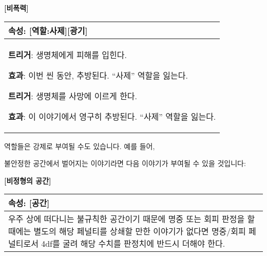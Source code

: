 \documentclass[12pt]{report}
\newenvironment{story}[2]
{\begin{center}
		{\large \textbf{[#1]}}\\[1ex]
		\begin{tabular}{|p{\textwidth}|}
			\hline
			\textbf{속성}: #2
			\\
			\hline
		}
		{ 
			\\\hline
		\end{tabular}
	\end{center}
}
\begin{document}
	\begin{story}{비폭력}{[역할:사제][광기]}
		\textbf{트리거}: 생명체에게 피해를 입힌다.
		
		\textbf{효과}: 이번 씬 동안, 추방된다. “사제” 역할을 잃는다.
		
		\textbf{트리거}: 생명체를 사망에 이르게 한다.
		
		\textbf{효과}: 이 이야기에서 영구히 추방된다. “사제” 역할을 잃는다.
	\end{story}
	
	역할들은 강제로 부여될 수도 있습니다. 예를 들어,
\iffalse
	러브크래프트 세계관에 들어간 이야기꾼들은 다음과 같은 역할이 부여될 수 있습니다:
	\begin{story}{점점 미쳐가는 이야기}{[세계][설화][광기]}
		이성치 100을 얻는다. 일반적으로 이해할 수 없는 일(살인, 시체, 고대의 존재등)을 목격할때마다, 그 수준에 따라 난이도와 피해량(성공/실패, 다이스 사용 가능)을 시스템이 지정한다. 그러면 1d(현재 정신력)을 굴려, 해당 수치가 난이도 이상이라면 이성치에 성공 피해량을, 미만이라면 실패 피해량을 받는다. (e.g. 60[1d4/2d8]의 경우 주사위의 결과가 60 이상이 나오면 성공하며, 성공시 1d4 정신력, 실패시 2d8 정신력을 잃는다.)
		
		현재 이성치의 10\% 이상에 달하는 피해를 한번에 받은 이야기꾼은 해당 상황에 대한 이 시나리오에서의 [기피]를, 20\% 이상인 경우 이 시나리오에서의 [공포]를 얻는다. 25\% 이상인 경우, [공포]를 얻는 것은 같으나 이는 시나리오에서 벗어나도 유지된다. 이를 방지하기 위해 이성치에 받는 피해의 전부 또는 일부를 1대1의 비율로 정신력에 받을 수 있다.
	\end{story}
	또한, 
\fi
	불안정한 공간에서 벌어지는 이야기라면 다음 이야기가 부여될 수 있을 것입니다:
	\begin{story}{비정형의 공간}{[공간]}
		우주 상에 떠다니는 불규칙한 공간이기 때문에 명중 또는 회피 판정을 할 때에는 별도의 해당 페널티를 상쇄할 만한 이야기가 없다면 명중/회피 페널티로서 4df를 굴려 해당 수치를 판정치에 반드시 더해야 한다.
	\end{story}
	
\end{document}
